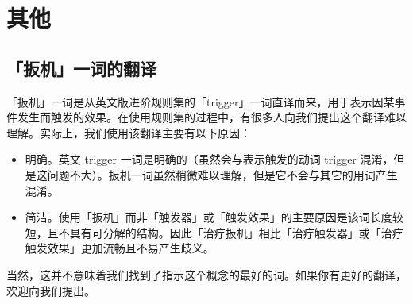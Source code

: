 \chapter{其他}

\section{「扳机」一词的翻译}

「扳机」一词是从英文版进阶规则集的「trigger」一词直译而来，用于表示因某事件发生而触发的效果。在使用规则集的过程中，有很多人向我们提出这个翻译难以理解。实际上，我们使用该翻译主要有以下原因：
\begin{itemize}
    \item 明确。英文 trigger 一词是明确的（虽然会与表示触发的动词 trigger 混淆，但是这问题不大）。扳机一词虽然稍微难以理解，但是它不会与其它的用词产生混淆。
    \item 简洁。使用「扳机」而非「触发器」或「触发效果」的主要原因是该词长度较短，且不具有可分解的结构。因此「治疗扳机」相比「治疗触发器」或「治疗触发效果」更加流畅且不易产生歧义。
\end{itemize}
当然，这并不意味着我们找到了指示这个概念的最好的词。如果你有更好的翻译，欢迎向我们提出。
